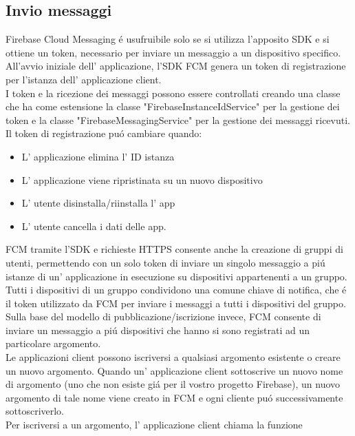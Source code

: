 \subsection{Invio messaggi}
Firebase Cloud Messaging \'e usufruibile solo se si utilizza l'apposito SDK e si ottiene un token, necessario per inviare un messaggio a un dispositivo specifico.\\
All'avvio iniziale dell' applicazione, l'SDK FCM genera un token di registrazione per l'istanza dell' applicazione client.\\
I token e la ricezione dei messaggi possono essere controllati creando una classe che ha come estensione la classe "FirebaseInstanceIdService" per la gestione dei token e la classe "FirebaseMessagingService" per la gestione dei messaggi ricevuti.\\

Il token di registrazione pu\'o cambiare quando:

\begin{itemize}
    \item L' applicazione elimina l' ID istanza
    \item L' applicazione viene ripristinata su un nuovo dispositivo
    \item L' utente disinstalla/riinstalla l' app
    \item L' utente cancella i dati delle app.
\end{itemize}

FCM tramite l'SDK e richieste HTTPS consente anche la creazione di gruppi di utenti, permettendo con un solo token di inviare un singolo messaggio a pi\'u istanze di un' applicazione in esecuzione su dispositivi appartenenti a un gruppo. Tutti i dispositivi di un gruppo condividono una comune chiave di notifica, che \'e il token utilizzato da FCM per inviare i messaggi a tutti i dispositivi del gruppo. \\

Sulla base del modello di pubblicazione/iscrizione invece, FCM consente di inviare un messaggio a pi\'u dispositivi che hanno si sono registrati ad un particolare argomento.\\
Le applicazioni client possono iscriversi a qualsiasi argomento esistente o creare un nuovo argomento. Quando un' applicazione client sottoscrive un nuovo nome di argomento (uno che non esiste gi\'a per il vostro progetto Firebase), un nuovo argomento di tale nome viene creato in FCM e ogni cliente pu\'o successivamente sottoscriverlo.\\
Per iscriversi a un argomento, l' applicazione client chiama la funzione

